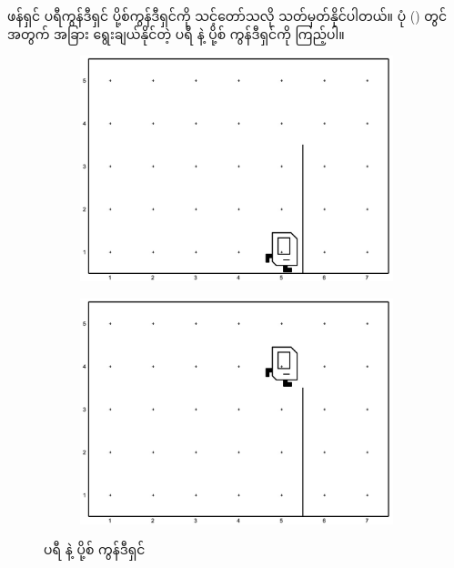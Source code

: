 ဖန်ရှင် ပရီကွန်ဒီရှင် ပို့စ်ကွန်ဒီရှင်ကို သင့်တော်သလို သတ်မှတ်နိုင်ပါတယ်။ ပုံ (\fRefNo{\ref{fig:mutp_pre_and_post_v2}}) တွင်  အတွက် အခြား ရွေးချယ်နိုင်တဲ့ ပရီ နဲ့ ပို့စ် ကွန်ဒီရှင်ကို  ကြည့်ပါ။

\begin{figure}[tbh!]
    \hfuzz=100pt
    \newcommand{\figpctw}{0.52}
    \newcommand{\figscale}{0.165}
    \begin{subfigure}[t]{{\figpctw}\textwidth}
        \includegraphics[scale=\figscale]{images/ch03/to_the_top/move_up_the_pole_pre_v2.jpg}
        \caption{}   
        \label{fig:mutp_pre_v2}
    \end{subfigure}
    \begin{subfigure}[t]{{\figpctw}\textwidth}
        \includegraphics[scale=\figscale]{images/ch03/to_the_top/move_up_the_pole_post_v2.jpg}
        \caption{} 
        \label{fig:mutp_post_v2}   
    \end{subfigure}
    \caption{ ပရီ နဲ့ ပို့စ် ကွန်ဒီရှင်}
    \label{fig:mutp_pre_and_post_v2}
\end{figure}

